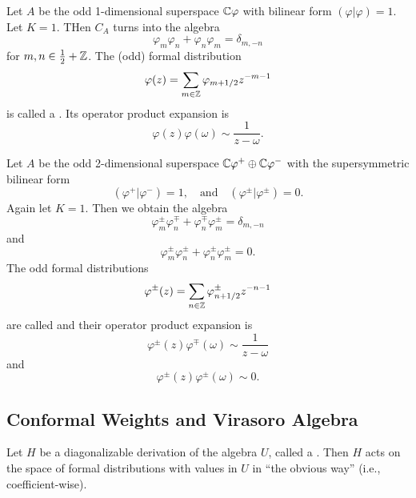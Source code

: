 Let $A$ be the odd 1-dimensional superspace $\mathbb{C}\varphi$ with bilinear
form $(\varphi|\varphi)=1$. Let $K=1$. THen $C_{A}$ turns into the
algebra
\begin{equation}
\varphi_{m}\varphi_{n}+\varphi_{n}\varphi_{m}=\delta_{m,-n}
\end{equation}
for $m,n\in\frac{1}{2}+\mathbb{Z}$. The (odd) formal distribution
\begin{equation}
\varphi(z)=\sum_{m\in\mathbb{Z}}\varphi_{m+1/2}z^{-m-1}
\end{equation}
is called a . Its operator product
expansion is
\begin{equation}
\varphi(z)\varphi(\omega)\sim\frac{1}{z-\omega}.
\end{equation}

Let $A$ be the odd 2-dimensional superspace
$\mathbb{C}\varphi^{+}\oplus\mathbb{C}\varphi^{-}$ with the supersymmetric bilinear
form
\begin{equation}
(\varphi^{+}|\varphi^{-})=1,\quad\mbox{and}\quad
(\varphi^{\pm}|\varphi^{\pm})=0.
\end{equation}
Again let $K=1$. Then we obtain the algebra
\begin{equation}
\varphi^{\pm}_{m}\varphi^{\mp}_{n}+\varphi^{\mp}_{n}\varphi^{\pm}_{m}
=\delta_{m,-n}
\end{equation}
and
\begin{equation}
\varphi^{\pm}_{m}\varphi^{\pm}_{n}+\varphi^{\pm}_{n}\varphi^{\pm}_{m}=0.
\end{equation}
The odd formal distributions
\begin{equation}
\varphi^{\pm}(z)=\sum_{n\in\mathbb{Z}}\varphi^{\pm}_{n+1/2}z^{-n-1}
\end{equation}
are called  and their operator product
expansion is
\begin{equation}
\varphi^{\pm}(z)\varphi^{\mp}(\omega)\sim\frac{1}{z-\omega}
\end{equation}
and
\begin{equation}
\varphi^{\pm}(z)\varphi^{\pm}(\omega)\sim0.
\end{equation}

\subsection{Conformal Weights and Virasoro Algebra}
\M
Let $H$ be a diagonalizable derivation of the algebra $U$, called a 
. Then $H$ acts on the space of formal distributions with 
values in $U$ in ``the obvious way'' (i.e., coefficient-wise).


